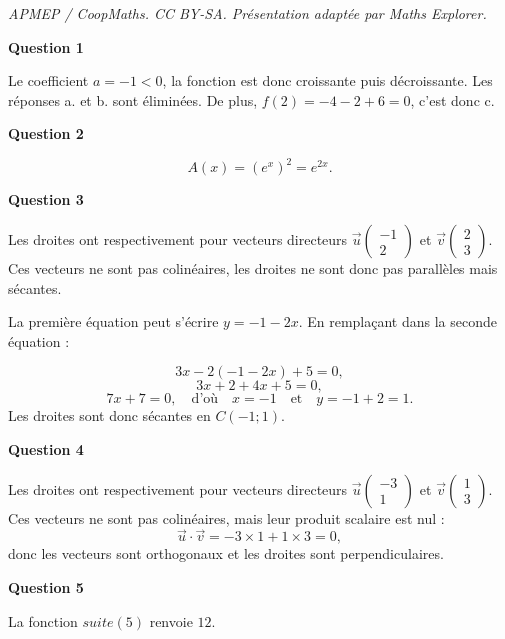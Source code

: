 \documentclass[10pt]{article}
\begin{document}
\noindent\textit{APMEP / CoopMaths. CC BY-SA. Présentation adaptée par Maths Explorer.}\par\medskip
\textbf{Question 1}
	
	Le coefficient $a = -1 < 0$, la fonction est donc croissante puis décroissante. Les réponses a. et b. sont éliminées. De plus, $f(2) = -4 - 2 + 6 = 0$, c’est donc c.
	
	\textbf{Question 2}
	
	\[
	A(x) = (e^x)^2 = e^{2x}.
	\]
	
	\textbf{Question 3}
	
	Les droites ont respectivement pour vecteurs directeurs $\overrightarrow{u}\left(\begin{array}{c}-1 \\ 2\end{array}\right)$ et $\overrightarrow{v}\left(\begin{array}{c}2 \\ 3\end{array}\right)$. Ces vecteurs ne sont pas colinéaires, les droites ne sont donc pas parallèles mais sécantes.
	
	La première équation peut s’écrire $y = -1 - 2x$. En remplaçant dans la seconde équation :
	
	\[
	3x - 2(-1 - 2x) + 5 = 0,
	\]
	\[
	3x + 2 + 4x + 5 = 0,
	\]
	\[
	7x + 7 = 0, \quad \text{d’où} \quad x = -1 \quad \text{et} \quad y = -1 + 2 = 1.
	\]
	Les droites sont donc sécantes en $C(-1; 1)$.
	
	\textbf{Question 4}
	
	Les droites ont respectivement pour vecteurs directeurs $\overrightarrow{u}\left(\begin{array}{c}-3 \\ 1\end{array}\right)$ et $\overrightarrow{v}\left(\begin{array}{c}1 \\ 3\end{array}\right)$. Ces vecteurs ne sont pas colinéaires, mais leur produit scalaire est nul :
	\[
	\overrightarrow{u} \cdot \overrightarrow{v} = -3 \times 1 + 1 \times 3 = 0,
	\]
	donc les vecteurs sont orthogonaux et les droites sont perpendiculaires.
	
	\textbf{Question 5}
	
	La fonction $suite(5)$ renvoie $12$.
\end{document}
